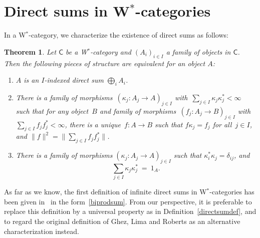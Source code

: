 \documentclass[reqno,T1,11pt]{amsproc}
\newcommand{\beq}{\begin{equation}}
\newcommand{\eeq}{\end{equation}}
\newcommand{\cat}[1]{\mathsf{#1}}		%
\theoremstyle{plain}
\newtheorem{thm}{Theorem}[section]
\theoremstyle{remark}
\numberwithin{equation}{section}
\begin{document}
\section{Direct sums in W$^*$-categories}
\label{wstarcatcase}

In a W$^*$-category, we characterize the existence of direct sums as follows:

\begin{thm}
\label{directsum_equiv}
Let $\cat{C}$ be a W$^*$-category and $(A_i)_{i\in I}$ a family of objects in $\cat{C}$. Then the following pieces of structure are equivalent for an object $A$:
\begin{enumerate}
\item\label{universalprop} $A$ is an $I$-indexed direct sum $\bigoplus_i A_i$.
\item\label{universalprop2} 
There is a family of
        morphisms~$\left(\kappa_j : A_j \to A\right)_{j\in I}$
        with~$\sum_{j \in I} \kappa_j \kappa_j^* < \infty$
        such that for any object~$B$
        and family of
        morphisms~$\left(f_j: A_j \to B\right)_{j\in I}$
        with~$\sum_{j \in I}f_j f_j^* < \infty$,
        there is a unique~$f\colon A \to B$
        such that $f \kappa_j = f_j$ for all~$j \in I$, and $\| f \|^2 = \| \sum_{j\in I} f_j f_j^* \|$.
\item\label{biprodsum} There is a family of morphisms $\left(\kappa_j : A_j \to A\right)_{j\in I}$ such that $\kappa_i^*\kappa_j = \delta_{ij}$, and
\beq
\label{complete}
        \sum_{j\in I} \kappa_j \kappa_j^* \ =\  1_A.
\eeq
\end{enumerate}
\end{thm}

As far as we know, the first definition of infinite direct sums in W$^*$-categories has been given in~\cite[p.~100]{wstarcat} in the form~\ref{biprodsum}. From our perspective, it is preferable to replace this definition by a universal property as in Definition~\ref{directsumdef}, and to regard the original definition of Ghez, Lima and Roberts as an alternative characterization instead.
\end{document}
